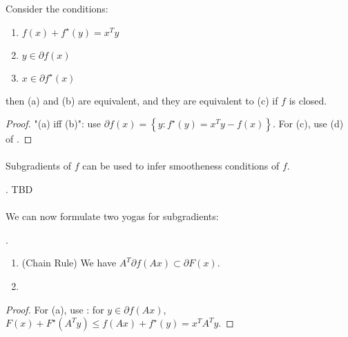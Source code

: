 \begin{prop}\label{prop:045-subgrad-conjugate}
	Consider the conditions:
	\begin{enumerate}[label=(\alph*)]
		\item $f(x) + f^\star(y) = x^Ty$
		\item $y\in \partial f(x)$
		\item $x\in \partial f^\star(x)$
	\end{enumerate}
	then (a) and (b) are equivalent, and they are equivalent to (c) if $f$ is closed.
\end{prop}

\begin{proof}
	"(a) iff (b)": use $\partial f(x) = \left\{y:f^\star(y)=x^Ty-f(x)\right\}$. For (c), use (d) of .
\end{proof}

\paragraph{}Subgradients of $f$ can be used to infer smootheness conditions of $f$.

\begin{prop}\label{prop:045-subgradients-and-smoothness}.
	TBD
\end{prop}

\paragraph{}We can now formulate two yogas for subgradients:

\begin{prop}\label{prop:045-yoga-subgradients}.
	\begin{enumerate}[label=(\alph*)]
		\item (Chain Rule) We have $A^T\partial f(Ax)\subset \partial F(x)$.
		\item
	\end{enumerate}
\end{prop}

\begin{proof}
	For (a), use : for $y\in \partial f(Ax)$, $F(x)+F^\star(A^Ty)\leq f(Ax)+f^\star(y)=x^TA^Ty$.
\end{proof}


